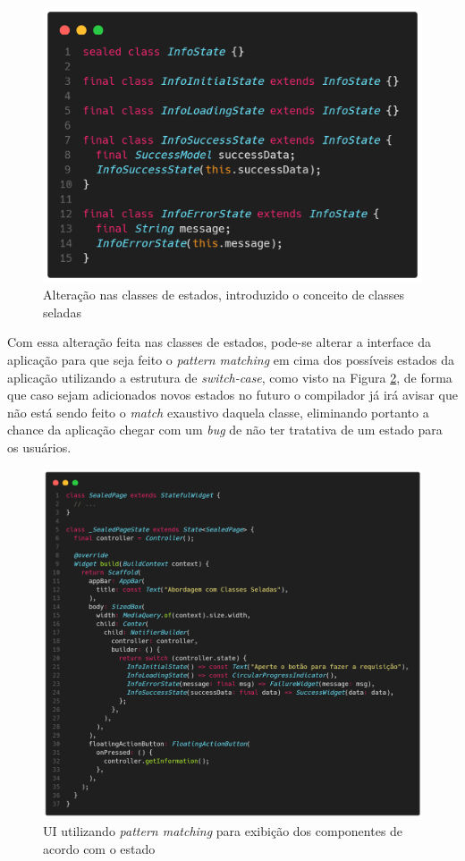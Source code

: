 \documentclass[12pt, %
openright, 
oneside, %
a4paper,    %
brazil]{facom-ufu-abntex2}
\begin{document}
\begin{figure}[ht]
    \centering
    \includegraphics[width=.65\textwidth, trim={0 30 0 100}, clip]{figures/states/sealed_states.png}
    \caption{Alteração nas classes de estados, introduzido o conceito de classes seladas}
    \label{fig:sealed_states}
\end{figure}

Com essa alteração feita nas classes de estados, pode-se alterar a interface da aplicação para que seja feito o \textit{pattern matching} em cima dos possíveis estados da aplicação utilizando a estrutura de \textit{switch-case}, como visto na Figura \ref{fig:sealed_page}, de forma que caso sejam adicionados novos estados no futuro o compilador já irá avisar que não está sendo feito o \textit{match} exaustivo daquela classe, eliminando portanto a chance da aplicação chegar com um \textit{bug} de não ter tratativa de um estado para os usuários.

\begin{figure}[ht]
    \centering
    \includegraphics[width=.65\textwidth, trim={0 30 0 100}, clip]{figures/states/sealed_page.png}
    \caption{UI utilizando \textit{pattern matching} para exibição dos componentes de acordo com o estado}
    \label{fig:sealed_page}
\end{figure}
\end{document}
